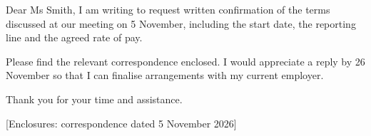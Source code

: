 \documentclass{jupiter-letter}
\begin{document}
\begin{jpletter}{Dear Ms Smith,}
I am writing to request written confirmation of the terms discussed at our meeting on 5 November, including the start date, the reporting line and the agreed rate of pay.

Please find the relevant correspondence enclosed. I would appreciate a reply by 26 November so that I can finalise arrangements with my current employer.

Thank you for your time and assistance.
\end{jpletter}
[Enclosures: correspondence dated 5 November 2026]
\end{document}
